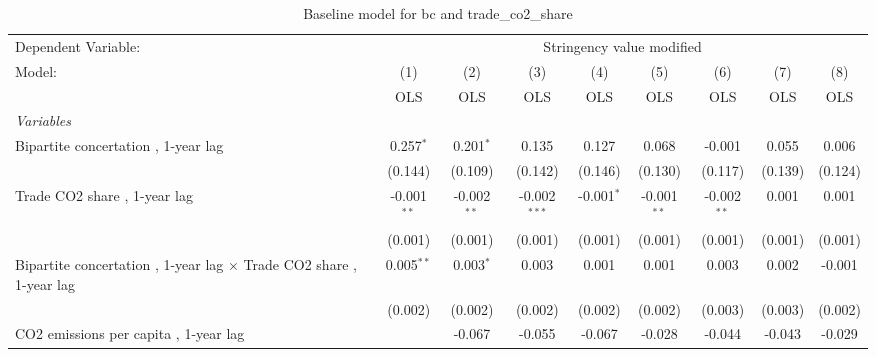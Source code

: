
\begin{table}[htbp]
   \caption{Baseline model for bc and trade\_co2\_share}
   \centering
   \begin{tabular}{lcccccccc}
      \toprule
      Dependent Variable: & \multicolumn{8}{c}{Stringency value modified}\\
      Model:                                                                     & (1)           & (2)           & (3)            & (4)          & (5)           & (6)           & (7)           & (8)\\  
                                                                                 &  OLS          & OLS           & OLS            & OLS          & OLS           & OLS           & OLS           & OLS\\  
      \midrule
      \emph{Variables}\\
      Bipartite concertation , 1-year lag                                        & 0.257$^{*}$   & 0.201$^{*}$   & 0.135          & 0.127        & 0.068         & -0.001        & 0.055         & 0.006\\   
                                                                                 & (0.144)       & (0.109)       & (0.142)        & (0.146)      & (0.130)       & (0.117)       & (0.139)       & (0.124)\\   
      Trade CO2 share , 1-year lag                                               & -0.001$^{**}$ & -0.002$^{**}$ & -0.002$^{***}$ & -0.001$^{*}$ & -0.001$^{**}$ & -0.002$^{**}$ & 0.001         & 0.001\\   
                                                                                 & (0.001)       & (0.001)       & (0.001)        & (0.001)      & (0.001)       & (0.001)       & (0.001)       & (0.001)\\   
      Bipartite concertation , 1-year lag $\times$ Trade CO2 share , 1-year lag  & 0.005$^{**}$  & 0.003$^{*}$   & 0.003          & 0.001        & 0.001         & 0.003         & 0.002         & -0.001\\   
                                                                                 & (0.002)       & (0.002)       & (0.002)        & (0.002)      & (0.002)       & (0.003)       & (0.003)       & (0.002)\\   
      CO2 emissions per capita , 1-year lag                                      &               & -0.067        & -0.055         & -0.067       & -0.028        & -0.044        & -0.043        & -0.029\\   

\end{tabular}
\end{table}

